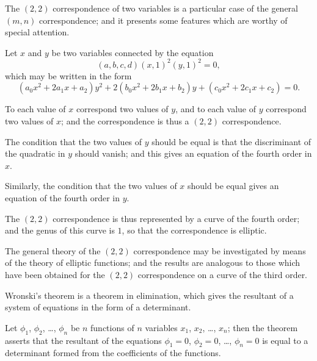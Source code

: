 \documentclass[11pt,a4paper]{book}
\begin{document}

The $(2,2)$ correspondence of two variables is a particular case of the general $(m,n)$ correspondence; and it presents some features which are worthy of special attention.

Let $x$ and $y$ be two variables connected by the equation
\[
(a, b, c, d)(x, 1)^2(y, 1)^2 = 0,
\]
which may be written in the form
\[
(a_0x^2 + 2a_1x + a_2)y^2 + 2(b_0x^2 + 2b_1x + b_2)y + (c_0x^2 + 2c_1x + c_2) = 0.
\]

To each value of $x$ correspond two values of $y$, and to each value of $y$ correspond two values of $x$; and the correspondence is thus a $(2,2)$ correspondence.

The condition that the two values of $y$ should be equal is that the discriminant of the quadratic in $y$ should vanish; and this gives an equation of the fourth order in $x$.

\newpage

Similarly, the condition that the two values of $x$ should be equal gives an equation of the fourth order in $y$.

The $(2,2)$ correspondence is thus represented by a curve of the fourth order; and the genus of this curve is $1$, so that the correspondence is elliptic.

The general theory of the $(2,2)$ correspondence may be investigated by means of the theory of elliptic functions; and the results are analogous to those which have been obtained for the $(2,2)$ correspondence on a curve of the third order.

\newpage


Wronski's theorem is a theorem in elimination, which gives the resultant of a system of equations in the form of a determinant.

Let $\phi_1$, $\phi_2$, \ldots, $\phi_n$ be $n$ functions of $n$ variables $x_1$, $x_2$, \ldots, $x_n$; then the theorem asserts that the resultant of the equations $\phi_1 = 0$, $\phi_2 = 0$, \ldots, $\phi_n = 0$ is equal to a determinant formed from the coefficients of the functions.
\end{document}
